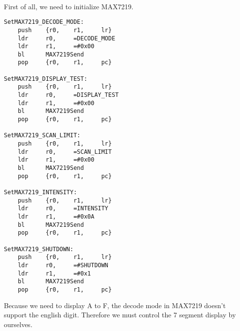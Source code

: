 \paragraph{}
First of all, we need to initialize MAX7219.
\begin{lstlisting}
SetMAX7219_DECODE_MODE:
    push    {r0,    r1,     lr}
    ldr     r0,     =DECODE_MODE
    ldr     r1,     =#0x00
    bl      MAX7219Send
    pop     {r0,    r1,     pc}

SetMAX7219_DISPLAY_TEST:
    push    {r0,    r1,     lr}
    ldr     r0,     =DISPLAY_TEST
    ldr     r1,     =#0x00
    bl      MAX7219Send
    pop     {r0,    r1,     pc}

SetMAX7219_SCAN_LIMIT:
    push    {r0,    r1,     lr}
    ldr     r0,     =SCAN_LIMIT
    ldr     r1,     =#0x00
    bl      MAX7219Send
    pop     {r0,    r1,     pc}

SetMAX7219_INTENSITY:
    push    {r0,    r1,     lr}
    ldr     r0,     =INTENSITY
    ldr     r1,     =#0x0A
    bl      MAX7219Send
    pop     {r0,    r1,     pc}

SetMAX7219_SHUTDOWN:
    push    {r0,    r1,     lr}
    ldr     r0,     =#SHUTDOWN
    ldr     r1,     =#0x1
    bl      MAX7219Send
    pop     {r0,    r1,     pc}
\end{lstlisting}
Because we need to display A to F, the decode mode in MAX7219 doesn't support the english digit. Therefore we must control the 7 segment display by ourselves.

